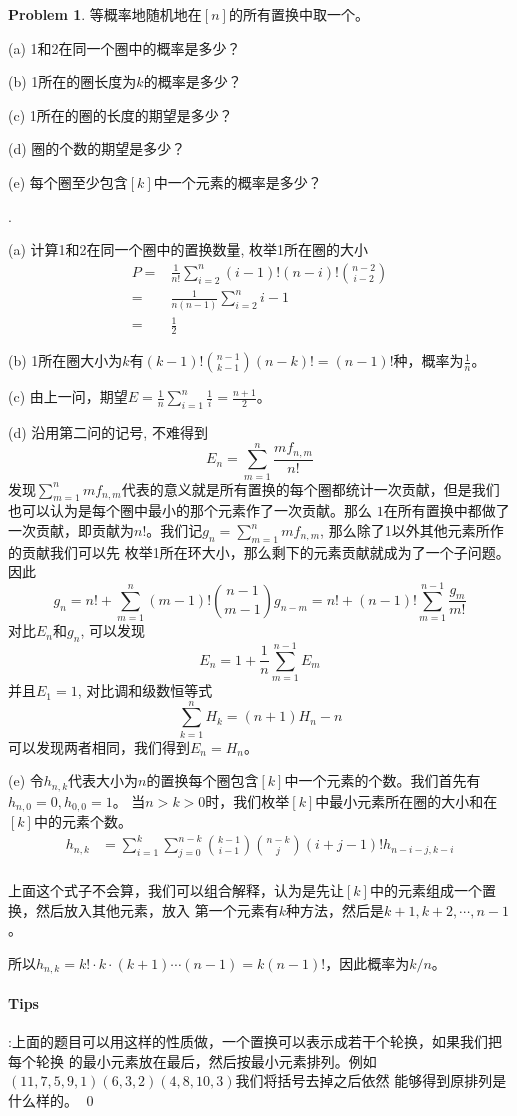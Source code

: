 \documentclass[UTF8]{ctexart}
\newenvironment{sol}
  {\par\vspace{3mm}\noindent{\it Solution}.}
  {\qed \\ \medskip}
\theoremstyle{definition}
\newtheorem{problem}{Problem}
\begin{document}
\begin{problem}
等概率地随机地在$[n]$的所有置换中取一个。

(a) 1和2在同一个圈中的概率是多少？

(b) 1所在的圈长度为$k$的概率是多少？

(c) 1所在的圈的长度的期望是多少？

(d) 圈的个数的期望是多少？

(e) 每个圈至少包含$[k]$中一个元素的概率是多少？
\begin{sol}

  (a) 计算1和2在同一个圈中的置换数量, 枚举1所在圈的大小
  \begin{align*}
      P
      =&\frac 1 {n!} \sum_{i=2}^n(i-1)!(n-i)!\binom{n-2}{i-2}\\
      =&\frac 1 {n(n-1)} \sum_{i=2}^n i-1 \\
      =& \frac 1 2
  \end{align*}

  (b) 1所在圈大小为$k$有$(k-1)!\binom{n-1}{k-1}(n-k)!=(n-1)!$种，概率为$\frac 1 n$。

  (c) 由上一问，期望$E=\frac 1 n \sum_{i=1}^n\frac 1 i= \frac {n+1} 2$。

  (d) 沿用第二问的记号, 不难得到
  $$
    E_n=\sum_{m=1}^n\frac {mf_{n,m}} {n!} 
  $$
  发现$\sum_{m=1}^n mf_{n,m}$代表的意义就是所有置换的每个圈都统计一次贡献，但是我们也可以认为是每个圈中最小的那个元素作了一次贡献。那么
  $1$在所有置换中都做了一次贡献，即贡献为$n!$。我们记$g_n=\sum_{m=1}^n mf_{n,m}$, 那么除了1以外其他元素所作的贡献我们可以先
  枚举1所在环大小，那么剩下的元素贡献就成为了一个子问题。因此
  $$
  g_n = n! + \sum_{m=1}^n (m-1)!\binom{n-1}{m-1}g_{n-m} = n! + (n-1)!\sum_{m=1}^{n-1}\frac {g_m} {m!}
  $$
  对比$E_n$和$g_n$, 可以发现
  $$
  E_n = 1 + \frac 1 n \sum_{m=1}^{n-1}E_m
  $$
  并且$E_1=1$, 对比调和级数恒等式
  $$\sum _{{k=1}}^{n}H_{k}=(n+1)H_{n}-n$$
  可以发现两者相同，我们得到$E_n=H_n$。

  (e) 令$h_{n,k}$代表大小为$n$的置换每个圈包含$[k]$中一个元素的个数。我们首先有$h_{n,0}=0, h_{0,0}=1$。
  当$n>k>0$时，我们枚举$[k]$中最小元素所在圈的大小和在$[k]$中的元素个数。
  \begin{align*}
    h_{n,k}&=\sum_{i=1}^{k}\sum_{j=0}^{n-k}\binom{k-1}{i-1}\binom{n-k}{j}(i+j-1)!h_{n-i-j,k-i}\\
  \end{align*}

  上面这个式子不会算，我们可以组合解释，认为是先让$[k]$中的元素组成一个置换，然后放入其他元素，放入
  第一个元素有$k$种方法，然后是$k+1,k+2,\cdots,n-1$。
  
  所以$h_{n,k}=k!\cdot k \cdot (k+1)\cdots(n-1)=k(n-1)!$，因此概率为$k/n$。
  
  \paragraph{Tips}:上面的题目可以用这样的性质做，一个置换可以表示成若干个轮换，如果我们把每个轮换
  的最小元素放在最后，然后按最小元素排列。例如$(11,7,5,9,1)(6,3,2)(4,8,10,3)$我们将括号去掉之后依然
  能够得到原排列是什么样的。
\end{sol}
\end{problem}
\end{document}
